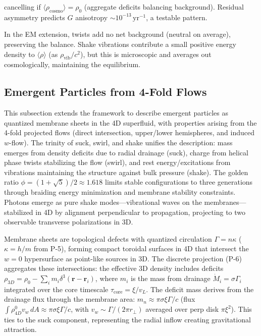 cancelling if $\langle \rho_\text{cosmo} \rangle = \rho_0$ (aggregate deficits balancing background). Residual asymmetry predicts $G$ anisotropy $\sim 10^{-13} \,\mathrm{yr}^{-1}$, a testable pattern.

In the EM extension, twists add no net background (neutral on average), preserving the balance. Shake vibrations contribute a small positive energy density to $\langle \rho \rangle$ (as $\rho_{\text{vib}} / c^2$), but this is microscopic and averages out cosmologically, maintaining the equilibrium.

\medskip
\noindent
{}
\medskip

\subsection{Emergent Particles from 4-Fold Flows}

This subsection extends the framework to describe emergent particles as quantized membrane sheets in the 4D superfluid, with properties arising from the 4-fold projected flows (direct intersection, upper/lower hemispheres, and induced $w$-flow). The trinity of suck, swirl, and shake unifies the description: mass emerges from density deficits due to radial drainage (suck), charge from helical phase twists stabilizing the flow (swirl), and rest energy/excitations from vibrations maintaining the structure against bulk pressure (shake). The golden ratio $\phi = (1 + \sqrt{5})/2 \approx 1.618$ limits stable configurations to three generations through braiding energy minimization and membrane stability constraints. Photons emerge as pure shake modes—vibrational waves on the membranes—stabilized in 4D by alignment perpendicular to propagation, projecting to two observable transverse polarizations in 3D.

Membrane sheets are topological defects with quantized circulation $\Gamma = n \kappa$ ($\kappa = h / m$ from P-5), forming compact toroidal surfaces in 4D that intersect the $w=0$ hypersurface as point-like sources in 3D. The discrete projection (P-6) aggregates these intersections: the effective 3D density includes deficits $\rho_{3D} = \rho_0 - \sum_i m_i \delta^3(\mathbf{r} - \mathbf{r}_i)$, where $m_i$ is the mass from drainage $\dot{M}_i = \sigma \Gamma_i$ integrated over the core timescale $\tau_{\text{core}} = \xi / v_L$. The deficit mass derives from the drainage flux through the membrane area: $m_n \approx \pi \sigma \xi \Gamma / c$ (flux $\int \rho_{4D}^0 v_w \, dA \approx \pi \sigma \xi \Gamma / c$, with $v_w \sim \Gamma / (2\pi r_\perp)$ averaged over perp disk $\pi \xi^2$). This ties to the suck component, representing the radial inflow creating gravitational attraction.

